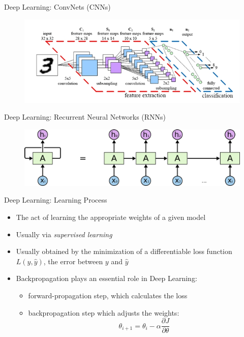 \documentclass[10pt]{beamer}
\begin{document}
\begin{frame}{Deep Learning: ConvNets (CNNs)}
    \begin{figure}
        \centering
        \includegraphics[width=1.0\linewidth]{./img/cnn.png}
    \end{figure}
\end{frame}

\begin{frame}{Deep Learning: Recurrent Neural Networks (RNNs)}
    \begin{figure}
        \centering
        \includegraphics[width=0.9\linewidth]{./img/rnn2.png}
    \end{figure}
\end{frame}

\begin{frame}{Deep Learning: Learning Process}
    \begin{itemize}
        \item The act of learning the appropriate weights of a given model
        \item Usually via \emph{supervised learning}
        \item Usually obtained by the minimization of a differentiable loss function
            $L(y, \hat{y})$, the error between $y$ and $\hat{y}$
        \item Backpropagation plays an essential role in Deep Learning:
        \begin{itemize}
            \item forward-propagation step, which calculates the loss
            \item backpropagation step which adjusts the weights:
    $$\theta_{i+1} = \theta_i - \alpha\frac{\partial{J}}{\partial{\theta}}$$
        \end{itemize}
    \end{itemize}
\end{frame}
\end{document}
